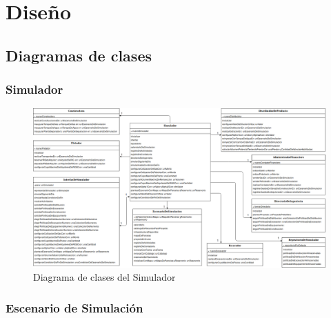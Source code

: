 \documentclass[10pt,a3paper, ,landscape]{article}
\begin{document}
\maketitle

\tableofcontents

\pagebreak

\section{Diseño}

\subsection{Diagramas de clases}

\subsubsection{Simulador}

\begin{figure}[H]
\centerline{\includegraphics[scale=0.7]{images/DiagramaDeClases_deSimulador.png}}
\caption{Diagrama de clases del Simulador}
\end{figure}

\subsubsection{Escenario de Simulación}
\end{document}
